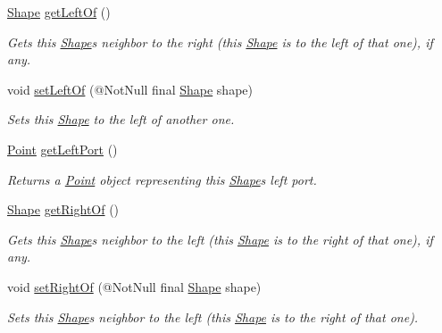 \begin{DoxyCompactItemize}
\hyperlink{classcom_1_1aarrelaakso_1_1drawl_1_1_shape}{Shape} \hyperlink{classcom_1_1aarrelaakso_1_1drawl_1_1_shape_a2b19d5964ac46d545a7bae3133df6532}{get\+Left\+Of} ()
\begin{DoxyCompactList}\small\item\em Gets this \hyperlink{classcom_1_1aarrelaakso_1_1drawl_1_1_shape}{Shape}\textquotesingle{}s neighbor to the right (this \hyperlink{classcom_1_1aarrelaakso_1_1drawl_1_1_shape}{Shape} is to the left of that one), if any. \end{DoxyCompactList}\item 
void \hyperlink{classcom_1_1aarrelaakso_1_1drawl_1_1_shape_a0aef56392d76202235a9520394e87492}{set\+Left\+Of} (@Not\+Null final \hyperlink{classcom_1_1aarrelaakso_1_1drawl_1_1_shape}{Shape} shape)
\begin{DoxyCompactList}\small\item\em Sets this \hyperlink{classcom_1_1aarrelaakso_1_1drawl_1_1_shape}{Shape} to the left of another one. \end{DoxyCompactList}\item 
\hyperlink{classcom_1_1aarrelaakso_1_1drawl_1_1_point}{Point} \hyperlink{classcom_1_1aarrelaakso_1_1drawl_1_1_shape_aeffa96786ca552adf46924ec77da9555}{get\+Left\+Port} ()
\begin{DoxyCompactList}\small\item\em Returns a \hyperlink{classcom_1_1aarrelaakso_1_1drawl_1_1_point}{Point} object representing this \hyperlink{classcom_1_1aarrelaakso_1_1drawl_1_1_shape}{Shape}\textquotesingle{}s left port. \end{DoxyCompactList}\item 
\hyperlink{classcom_1_1aarrelaakso_1_1drawl_1_1_shape}{Shape} \hyperlink{classcom_1_1aarrelaakso_1_1drawl_1_1_shape_a1ad573b06f341aa79f6a255a476ae6e4}{get\+Right\+Of} ()
\begin{DoxyCompactList}\small\item\em Gets this \hyperlink{classcom_1_1aarrelaakso_1_1drawl_1_1_shape}{Shape}\textquotesingle{}s neighbor to the left (this \hyperlink{classcom_1_1aarrelaakso_1_1drawl_1_1_shape}{Shape} is to the right of that one), if any. \end{DoxyCompactList}\item 
void \hyperlink{classcom_1_1aarrelaakso_1_1drawl_1_1_shape_a3cada5e03bd1552a79702d2945c7ed01}{set\+Right\+Of} (@Not\+Null final \hyperlink{classcom_1_1aarrelaakso_1_1drawl_1_1_shape}{Shape} shape)
\begin{DoxyCompactList}\small\item\em Sets this \hyperlink{classcom_1_1aarrelaakso_1_1drawl_1_1_shape}{Shape}\textquotesingle{}s neighbor to the left (this \hyperlink{classcom_1_1aarrelaakso_1_1drawl_1_1_shape}{Shape} is to the right of that one). \end{DoxyCompactList}\item 

\end{DoxyCompactItemize}

